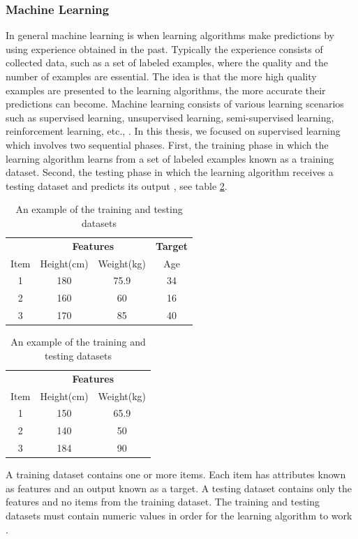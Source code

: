\documentclass[a4paper,12pt]{article}
\begin{document}
\subsubsection{Machine Learning}
In general machine learning is when learning algorithms make predictions by using experience obtained in the past. Typically the experience consists of collected data, such as a set of labeled examples, where the quality and the number of examples are essential. The idea is that the more high quality examples are presented to the learning algorithms, the more accurate their predictions can become. Machine learning consists of various learning scenarios such as supervised learning, unsupervised learning, semi-supervised learning, reinforcement learning, etc., \cite{FOML-2012}. In this thesis, we focused on supervised learning which involves two sequential phases. First, the training phase in which the learning algorithm learns from a set of labeled examples known as a training dataset. Second, the testing phase in which the learning algorithm receives a testing dataset and predicts its output \cite{ML-2016}, see table \ref{ExampleDatasets}.
\begin{table}[H]
	\begin{subtable}{.5\linewidth}
		\centering
		\begin{tabular}{c|c|c|c}
			\hline
			\multicolumn{1}{c|}{} & \multicolumn{2}{c|}{\textbf{Features}} & \multicolumn{1}{c}{\textbf{Target}} \\
			\cline{1-3} \cline{3-4}
			Item & Height(cm) & Weight(kg) & Age \\
			\hline
			1 & 180 & 75.9 & 34 \\
			\hline
			2 & 160 & 60 &  16 \\
			\hline
			3 & 170 & 85 & 40 \\
			\hline
		\end{tabular}
		\caption{Training dataset}
	\end{subtable}
	\begin{subtable}{.5\linewidth}
		\centering
		\begin{tabular}{c|cc}
			\hline
			\multicolumn{1}{c|}{} & \multicolumn{2}{c}{\textbf{Features}} \\
			\cline{1-3}
			Item & Height(cm) & Weight(kg) \\
			\hline
			1 & 150 & 65.9 \\
			\hline
			2 & 140 & 50 \\
			\hline
			3 & 184 & 90 \\
			\hline
		\end{tabular}
		\caption{Testing dataset}
	\end{subtable} 
	\caption{An example of the training and testing datasets}
	\label{ExampleDatasets}
\end{table}
A training dataset contains one or more items. Each item has attributes known as features and an output known as a target. A testing dataset contains only the features and no items from the training dataset. The training and testing datasets must contain numeric values in order for the learning algorithm to work \cite{HOMLWSLATF-2017}.
\end{document}
